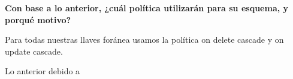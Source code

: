 \begin{center}
    \textbf{Con base a lo anterior, ¿cuál política utilizarán para su esquema, y porqué motivo?}
\end{center}

Para todas nuestras llaves foránea usamos la política on delete cascade y on update cascade.

Lo anterior debido a 
